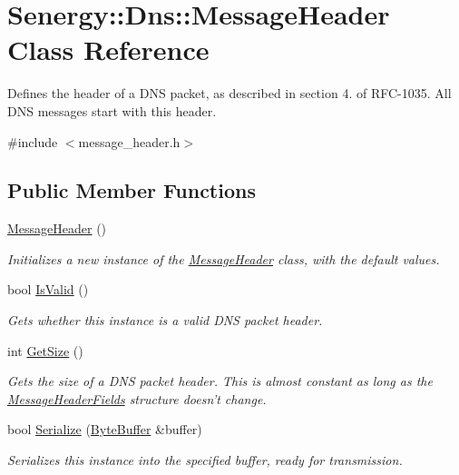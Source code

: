 \hypertarget{class_senergy_1_1_dns_1_1_message_header}{\section{Senergy\-:\-:Dns\-:\-:Message\-Header Class Reference}
\label{class_senergy_1_1_dns_1_1_message_header}
}


Defines the header of a D\-N\-S packet, as described in section 4. of R\-F\-C-\/1035. All D\-N\-S messages start with this header.  




{\ttfamily \#include $<$message\-\_\-header.\-h$>$}

\subsection*{Public Member Functions}
\begin{DoxyCompactItemize}
\item 
\hyperlink{class_senergy_1_1_dns_1_1_message_header_aa103a12edc759b885f57728c091a84eb}{Message\-Header} ()
\begin{DoxyCompactList}\small\item\em Initializes a new instance of the \hyperlink{class_senergy_1_1_dns_1_1_message_header}{Message\-Header} class, with the default values. \end{DoxyCompactList}\item 
bool \hyperlink{class_senergy_1_1_dns_1_1_message_header_a3636da2fa7e96513080d1985ef515958}{Is\-Valid} ()
\begin{DoxyCompactList}\small\item\em Gets whether this instance is a valid D\-N\-S packet header. \end{DoxyCompactList}\item 
int \hyperlink{class_senergy_1_1_dns_1_1_message_header_a69f4475bc3153926dbb011f37cbbfea9}{Get\-Size} ()
\begin{DoxyCompactList}\small\item\em Gets the size of a D\-N\-S packet header. This is almost constant as long as the \hyperlink{struct_senergy_1_1_dns_1_1_message_header_fields}{Message\-Header\-Fields} structure doesn't change. \end{DoxyCompactList}\item 
bool \hyperlink{class_senergy_1_1_dns_1_1_message_header_ab443595ff8e11a828022f0cc5f3f6fbe}{Serialize} (\hyperlink{class_senergy_1_1_byte_buffer}{Byte\-Buffer} \&buffer)
\begin{DoxyCompactList}\small\item\em Serializes this instance into the specified buffer, ready for transmission. \end{DoxyCompactList}\end{DoxyCompactItemize}
